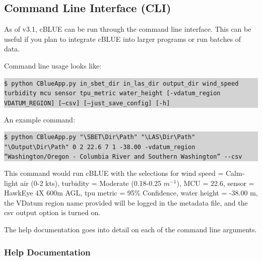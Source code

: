 \documentclass[11pt, a4paper]{article}
\begin{document}
\subsection{Command Line Interface (CLI)}

As of v3.1, cBLUE can be run through the command line interface. This can be useful if you plan to integrate cBLUE into larger programs or run batches of data.

\vspace{1em}

Command line usage looks like:

\vspace{1em}

\colorbox{lightgray}{\begin{minipage}{\linewidth}
    \texttt{\$ python CBlueApp.py in\_sbet\_dir in\_las\_dir output\_dir wind\_speed turbidity mcu sensor
    tpu\_metric water\_height [-vdatum\_region VDATUM\_REGION] [--csv] [--just\_save\_config] [-h]}
\end{minipage}}

\vspace{1em}

An example command: 

\vspace{1em}

\colorbox{lightgray}{\begin{minipage}{\linewidth}
    \texttt{\$ python CBlueApp.py "\textbackslash SBET\textbackslash Dir\textbackslash Path" "\textbackslash LAS\textbackslash Dir\textbackslash Path" "\textbackslash Output\textbackslash Dir\textbackslash Path" 0 2 22.6 7 1 -38.00 -vdatum\_region “Washington/Oregon - Columbia River and Southern Washington” -{}-csv}
\end{minipage}}

\vspace{1em}

This command would run cBLUE with the selections for wind speed = Calm-light air (0-2 kts), turbidity = Moderate (0.18-0.25 $m^{-1}$), MCU = 22.6, sensor = HawkEye 4X 600m AGL, tpu metric = 95\% Confidence, water height = -38.00 m, the VDatum region name provided will be logged in the metadata file, and the csv output option is turned on.

\vspace{1em}

The help documentation goes into detail on each of the command line arguments.

\subsubsection{Help Documentation}
\end{document}
